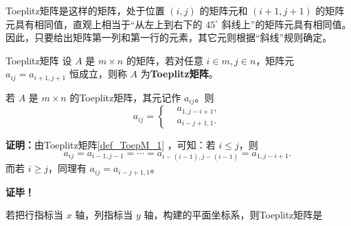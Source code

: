 

Toeplitz矩阵是这样的矩阵，处于位置 $(i,j)$ 的矩阵元和 $(i+1,j+1)$ 的矩阵元具有相同值，直观上相当于“从左上到右下的 $45^\circ$ 斜线上”的矩阵元具有相同值。因此，只要给出矩阵第一列和第一行的元素，其它元则根据“斜线”规则确定。

\begin{definition}{Toeplitz矩阵}\label{def_ToepM_1}
设 $A$ 是 $m\times n$ 的矩阵，若对任意 $i\in m,j\in n$，矩阵元 $a_{ij}=a_{i+1,j+1}$ 恒成立，则称 $A$ 为\textbf{Toeplitz矩阵}。
\end{definition}

\begin{theorem}{}
若 $A$ 是 $m\times n$ 的Toeplitz矩阵，其元记作 $a_{ij}$。则
\begin{equation}
a_{ij}=\left\{\begin{aligned}
&a_{1,j-i+1},\\
&a_{i-j+1,1}.
\end{aligned}\right.~
\end{equation}
\end{theorem}

\textbf{证明：}由Toeplitz矩阵\autoref{def_ToepM_1} ，可知：若 $i\leq j$，则
\begin{equation}
a_{ij}=a_{i-1,j-1}=\cdots=a_{i-(i-1),j-(i-1)}=a_{1,j-i+1}.~
\end{equation}
而若 $i\geq j$，同理有 $a_{ij}=a_{i-j+1,1}$。

\textbf{证毕！}

若把行指标当 $x$ 轴，列指标当 $y$ 轴，构建的平面坐标系，则Toeplitz矩阵是



